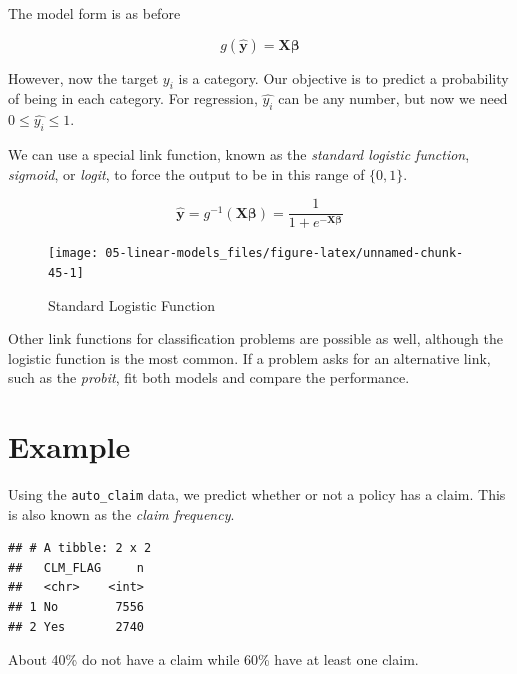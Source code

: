 \documentclass[openany]{book}
\newenvironment{Shaded}{\begin{snugshade}}{\end{snugshade}}
\newcommand{\KeywordTok}[1]{\textcolor[rgb]{0.13,0.29,0.53}{\textbf{#1}}}
\newcommand{\NormalTok}[1]{#1}
\newcommand{\OperatorTok}[1]{\textcolor[rgb]{0.81,0.36,0.00}{\textbf{#1}}}
\newcommand{\StringTok}[1]{\textcolor[rgb]{0.31,0.60,0.02}{#1}}
\begin{document}
The model form is as before

\[g(\mathbf{\hat{y}}) = \mathbf{X} \mathbf{\beta}\]

However, now the target \(y_i\) is a category. Our objective is to predict a probability of being in each category. For regression, \(\hat{y_i}\) can be any number, but now we need \(0 \leq \hat{y_i} \leq 1\).

We can use a special link function, known as the \emph{standard logistic function}, \emph{sigmoid}, or \emph{logit}, to force the output to be in this range of \(\{0,1\}\).

\[\mathbf{\hat{y}} = g^{-1}(\mathbf{X} \mathbf{\beta}) = \frac{1}{1 + e^{-\mathbf{X} \mathbf{\beta}}}\]

\begin{figure}

{\centering \texttt{[image: 05-linear-models\_files/figure-latex/unnamed-chunk-45-1]} 

}

\caption{Standard Logistic Function}\label{fig:unnamed-chunk-45}
\end{figure}

Other link functions for classification problems are possible as well, although the logistic function is the most common. If a problem asks for an alternative link, such as the \emph{probit}, fit both models and compare the performance.

\hypertarget{example-2}{%
\section{Example}\label{example-2}}

Using the \texttt{auto\_claim} data, we predict whether or not a policy has a claim. This is also known as the \emph{claim frequency}.

\begin{Shaded}
\end{Shaded}

\begin{verbatim}
## # A tibble: 2 x 2
##   CLM_FLAG     n
##   <chr>    <int>
## 1 No        7556
## 2 Yes       2740
\end{verbatim}

About 40\% do not have a claim while 60\% have at least one claim.
\end{document}
